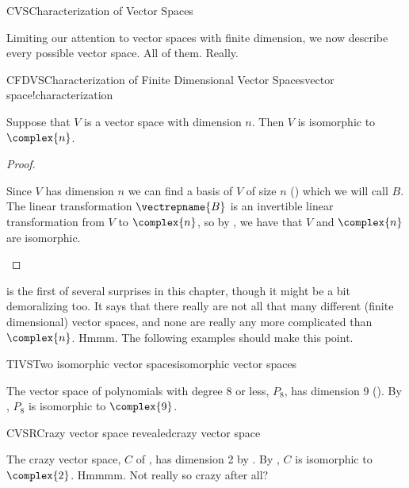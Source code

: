 \begin{subsect}{CVS}{Characterization of Vector Spaces}
%
\begin{para}Limiting our attention to vector spaces with finite dimension, we now describe every possible vector space.  All of them.  Really.\end{para}
%
\begin{theorem}{CFDVS}{Characterization of Finite Dimensional Vector Spaces}{vector space!characterization}
\begin{para}Suppose that $V$ is a vector space with dimension $n$.  Then $V$ is isomorphic to $\complex{n}$.\end{para}
\end{theorem}
%
\begin{proof}
%
\begin{para}Since $V$ has dimension $n$ we can find a basis of $V$ of size $n$ () which we will call $B$.  The linear transformation $\vectrepname{B}$ is an invertible linear transformation from $V$ to $\complex{n}$, so by , we have that $V$ and $\complex{n}$ are isomorphic.\end{para}
%
\end{proof}
%
\begin{para} is the first of several surprises in this chapter, though it might be a bit demoralizing too.  It says that there really are not all that many different (finite dimensional) vector spaces, and none are really any more complicated than $\complex{n}$.  Hmmm.  The following examples should make this point.\end{para}
%
\begin{example}{TIVS}{Two isomorphic vector spaces}{isomorphic vector spaces}
\begin{para}The vector space of polynomials with degree 8 or less, $P_8$, has dimension 9 ().  By , $P_8$ is isomorphic to $\complex{9}$.\end{para}
\end{example}
%
\begin{example}{CVSR}{Crazy vector space revealed}{crazy vector space}
\begin{para}The crazy vector space, $C$ of , has dimension 2 by .  By , $C$ is isomorphic to $\complex{2}$.  Hmmmm.  Not really so crazy after all?\end{para}
\end{example}

\end{subsect}
